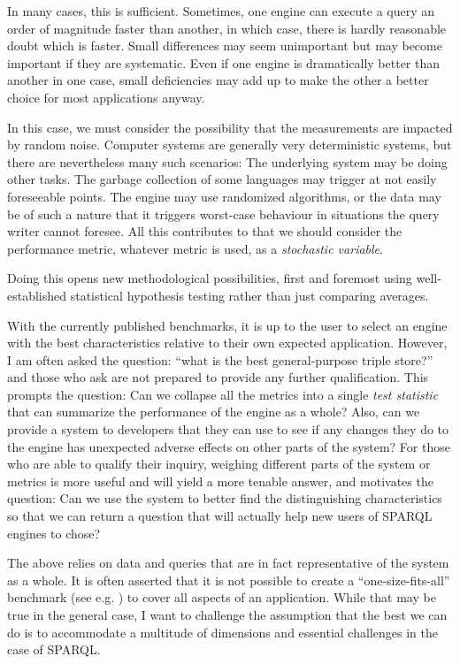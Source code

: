 \documentclass{llncs}
\begin{document}
In many cases, this is sufficient. Sometimes, one engine can execute a
query an order of magnitude faster than another, in which case, there
is hardly reasonable doubt which is faster. Small differences may seem
unimportant but may become important if they are systematic. Even if
one engine is dramatically better than another in one case, small
deficiencies may add up to make the other a better choice for most
applications anyway.

In this case, we must consider the possibility that the measurements
are impacted by random noise. Computer systems are generally very
deterministic systems, but there are nevertheless many such scenarios:
The underlying system may be doing other tasks. The garbage collection
of some languages may trigger at not easily foreseeable points. The
engine may use randomized algorithms, or the data may be of such a
nature that it triggers worst-case behaviour in situations the query
writer cannot foresee. All this contributes to that we should consider
the performance metric, whatever metric is used, as a \emph{stochastic
  variable}.

Doing this opens new methodological possibilities, first and foremost
using well-established statistical hypothesis testing rather than just
comparing averages. 

With the currently published benchmarks, it is up to the user to
select an engine with the best characteristics relative to their own
expected application. However, I am often asked the question: ``what
is the best general-purpose triple store?'' and those who ask are not
prepared to provide any further qualification. This prompts the
question: Can we collapse all the metrics into a single \emph{test
  statistic} that can summarize the performance of the engine as a
whole? Also, can we provide a system to developers that they can use
to see if any changes they do to the engine has unexpected adverse
effects on other parts of the system? For those who are able to
qualify their inquiry, weighing different parts of the system or
metrics is more useful and will yield a more tenable answer, and
motivates the question: Can we use the system to better find the
distinguishing characteristics so that we can return a question that
will actually help new users of SPARQL engines to chose? 

The above relies on data and queries that are in fact
representative of the system as a whole. It is often asserted that it
is not possible to create a ``one-size-fits-all'' benchmark (see
e.g. \cite{Schmidt:2011:FBS:2063016.2063054}) to cover all aspects of
an application. While that may be true in the general case, I want to
challenge the assumption that the best we can do is to accommodate a
multitude of dimensions and essential challenges in the case of
SPARQL.
\end{document}
